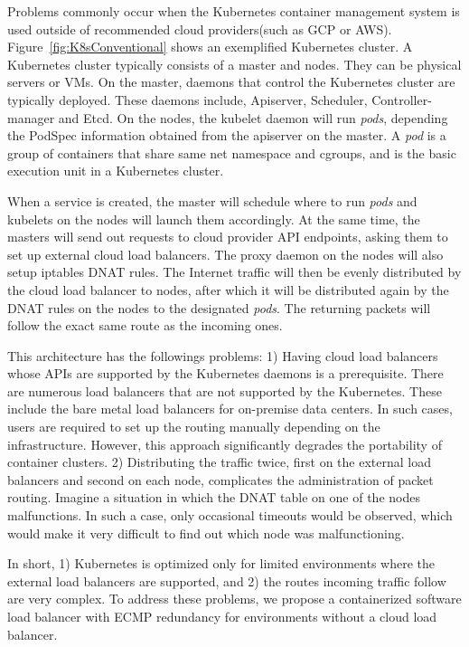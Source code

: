 Problems commonly occur when the Kubernetes container management system is used outside of recommended cloud providers(such as GCP or AWS).
Figure~\ref{fig:K8sConventional} shows an exemplified Kubernetes cluster.
A Kubernetes cluster typically consists of a master and nodes. They can be physical servers or VMs.
On the master, daemons that control the Kubernetes cluster are typically deployed. 
These daemons include, Apiserver, Scheduler, Controller-manager and Etcd. 
On the nodes, the kubelet daemon will run {\it pods}, depending the PodSpec information obtained from the apiserver on the master.
A {\em pod} is a group of containers that share same net namespace and cgroups, 
and is the basic execution unit in a Kubernetes cluster.

When a service is created, the master will schedule where to run {\em pods} and kubelets on the nodes will launch them accordingly.
At the same time, the masters will send out requests to cloud provider API endpoints, asking them to set up external cloud load balancers.
The proxy daemon on the nodes will also setup iptables DNAT\cite{MartinA.Brown2017} rules. 
The Internet traffic will then be evenly distributed by the cloud load balancer to nodes, 
after which it will be distributed again by the DNAT rules on the nodes to the designated {\em pods}. 
The returning packets will follow the exact same route as the incoming ones.

This architecture has the followings problems: 
1) Having cloud load balancers whose APIs are supported by the Kubernetes daemons is a prerequisite.
There are numerous load balancers that are not supported by the Kubernetes.
These include the bare metal load balancers for on-premise data centers.
In such cases, users are required to set up the routing manually depending on the infrastructure.
However, this approach significantly degrades the portability of container clusters.
2) Distributing the traffic twice, first on the external load balancers and second on each node, 
complicates the administration of packet routing. 
Imagine a situation in which the DNAT table on one of the nodes malfunctions.
In such a case, only occasional timeouts would be observed, which would make it very difficult to find out which node was malfunctioning.   

In short, 1) Kubernetes is optimized only for limited environments where the external load balancers are supported, 
and 2) the routes incoming traffic follow are very complex.
%
To address these problems, we propose a containerized software load balancer with ECMP redundancy for environments without a cloud load balancer.

